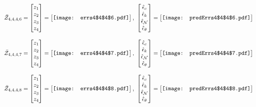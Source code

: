 \documentclass[12pt]{article}
\begin{document}
\begin{gather*}
\bar{\mathcal{Z}}_{4,4,4,6}=\begin{bmatrix}
z_1\\
z_2\\
z_3\\
z_4
 \end{bmatrix}= \begin{bmatrix}
\vcenter{\hbox{\texttt{[image: errs4\$4\$4\$6.pdf]}}}
 \end{bmatrix},\,\, \begin{bmatrix}
\hat{\epsilon}_c\\\hat{\epsilon}_k\\\hat{\epsilon}_\mathcal{N}\\\hat{\epsilon}_\theta
 \end{bmatrix}=\begin{bmatrix}
\vcenter{\hbox{\texttt{[image: predErrs4\$4\$4\$6.pdf]}}}
 \end{bmatrix}
\end{gather*}


\begin{gather*}
\bar{\mathcal{Z}}_{4,4,4,7}=\begin{bmatrix}
z_1\\
z_2\\
z_3\\
z_4
 \end{bmatrix}= \begin{bmatrix}
\vcenter{\hbox{\texttt{[image: errs4\$4\$4\$7.pdf]}}}
 \end{bmatrix},\,\, \begin{bmatrix}
\hat{\epsilon}_c\\\hat{\epsilon}_k\\\hat{\epsilon}_\mathcal{N}\\\hat{\epsilon}_\theta
 \end{bmatrix}=\begin{bmatrix}
\vcenter{\hbox{\texttt{[image: predErrs4\$4\$4\$7.pdf]}}}
 \end{bmatrix}
\end{gather*}


\begin{gather*}
\bar{\mathcal{Z}}_{4,4,4,8}=\begin{bmatrix}
z_1\\
z_2\\
z_3\\
z_4
 \end{bmatrix}= \begin{bmatrix}
\vcenter{\hbox{\texttt{[image: errs4\$4\$4\$8.pdf]}}}
 \end{bmatrix},\,\, \begin{bmatrix}
\hat{\epsilon}_c\\\hat{\epsilon}_k\\\hat{\epsilon}_\mathcal{N}\\\hat{\epsilon}_\theta
 \end{bmatrix}=\begin{bmatrix}
\vcenter{\hbox{\texttt{[image: predErrs4\$4\$4\$8.pdf]}}}
 \end{bmatrix}
\end{gather*}
\end{document}
